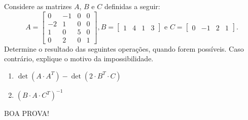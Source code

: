 \documentclass[12pt,a4paper]{article}
\newcommand{\fixme}{{\color{red}(...)}}
\begin{document}
\begin{ExerciseList}
\Answer \fixme

\Exercise[title={2,5}] Considere as matrizes $A$, $B$ e $C$ definidas a seguir:
\[
A = \begin{bmatrix}
0 & -1 & 0 & 0 \\
-2 & 1 & 0 & 0 \\
1 & 0 & 5 & 0 \\
0 & 2 & 0 & 1
\end{bmatrix},
B = \begin{bmatrix}
1 & 4 & 1 & 3
\end{bmatrix}
\text{ e }
C = \begin{bmatrix}
0 & -1 & 2 & 1
\end{bmatrix}.
\]
Determine o resultado das seguintes operações, quando forem possíveis. Caso contrário, explique o motivo da impossibilidade.
\begin{enumerate}
\item $\det{(A \cdot A^T)} - \det(2 \cdot B^T \cdot C)$
\item $(B \cdot A \cdot C^T)^{-1}$
\end{enumerate}
\Answer \fixme
\end{ExerciseList}

\begin{center}
BOA PROVA!
\end{center}

\end{document}
